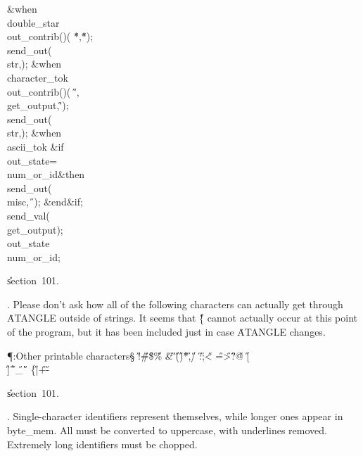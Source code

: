 \4\&{when}\8\\{double\_star}\KR\8\\{out\_contrib}\?\1(\?\to{}\?\2)\K\1(\?%
\H{*}\?,\?\H{*}\?\2)\?;\5
\\{send\_out}\?\1(\?\\{str}\?,\?\2)\?;\6
\4\&{when}\8\\{character\_tok}\KR\8\\{out\_contrib}\?\1(\?\to{}\?\2)\K\1(\?%
\H{\'}\?,\?\\{get\_output}\?,\?\H{\'}\?\2)\?;\5
\\{send\_out}\?\1(\?\\{str}\?,\?\2)\?;\6
\4\&{when}\8\\{ascii\_tok}\KR\6
\&{if}\1\1\8\\{out\_state}\?=\?\\{num\_or\_id}\2\8\&{then}\6
\\{send\_out}\?\1(\?\\{misc}\?,\?\H{\ }\?\2)\?;\2\6
\&{end}\8\2\&{if}\1;\6
\\{send\_val}\?\1(\?\\{get\_output}\?\2)\?;\5
\\{out\_state}\?\K\?\\{num\_or\_id};\par
\U section~101.\fi

. Please don't ask how all of the following characters can actually get
through \.{ATANGLE} outside of strings. It seems that \H{\{}
cannot actually occur at this point of the program, but it has
been included just in case \.{ATANGLE} changes.

\Y\P\?\4:Other printable characters\X\S\?\6
\H{!}\?\mathrel{\.|}\?\H{\#}\?\mathrel{\.|}\?\H{\$}\?\mathrel{\.|}\?\H{\%}\?%
\mathrel{\.|}\?\H{\&}\?\mathrel{\.|}\?\H{\'}\?\mathrel{\.|}\?\H{(}\?\mathrel{%
\.|}\?\H{)}\?\mathrel{\.|}\?\H{*}\?\mathrel{\.|}\?\H{,}\?\mathrel{\.|}\?\H{/}\?%
\mathrel{\.|}\?\H{:}\?\mathrel{\.|}\?\H{;}\?\mathrel{\.|}\?\H{<}\?\mathrel{\.|}%
\?\H{=}\?\mathrel{\.|}\?\H{>}\?\mathrel{\.|}\?\H{?}\?\mathrel{\.|}\?\H{@}\?%
\mathrel{\.|}\?\H{[}\?\mathrel{\.|}\?\H{\\}\?\mathrel{\.|}\?\H{]}\?\mathrel{%
\.|}\?\H{\^}\?\mathrel{\.|}\?\H{\_}\?\mathrel{\.|}\?\H{\`}\?\mathrel{\.|}\?\H{%
\{}\?\mathrel{\.|}\?\H{|}\?\mathrel{\.|}\?\H{+}\?\mathrel{\.|}\?\H{-}\?\6
\?\par
\U section~101.\fi

. Single-character identifiers represent themselves, while longer ones
appear in \\{byte\_mem}. All must be converted to uppercase,
with underlines removed. Extremely long identifiers must be chopped.

